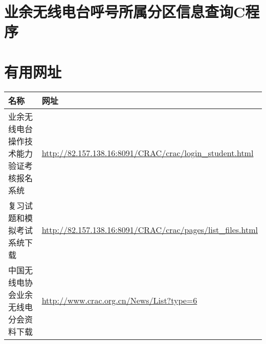 

\newpage

\section{业余无线电台呼号所属分区信息查询C程序}



\newpage

\section{有用网址}

\begin{longtable}{|p{8cm}|p{8cm}|}
  \hline
  \textbf{名称}          & \textbf{网址}                                                     \\
  \hline
  业余无线电台操作技术能力验证考核报名系统 & \url{http://82.157.138.16:8091/CRAC/crac/login_student.html}    \\
  \hline
  复习试题和模拟考试系统下载        & \url{http://82.157.138.16:8091/CRAC/crac/pages/list_files.html} \\
  \hline
  中国无线电协会业余无线电分会资料下载   & \url{http://www.crac.org.cn/News/List?type=6}                   \\
  \hline
\end{longtable}

